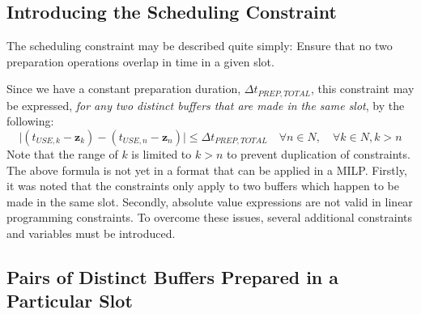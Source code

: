 \subsection{Introducing the Scheduling Constraint}\label{SS.schedintro}

The scheduling constraint may be described quite simply:
Ensure that no two preparation operations overlap in time in a given slot.

Since we have a constant preparation duration, 
$\Delta t_{\mathit{PREP,TOTAL}}$, this constraint may be expressed, 
\emph{for any two distinct buffers that are made in the same slot}, by the
following:
\begin{equation}
    \lvert \left( t_{\mathit{USE},k} - \boldsymbol{z}_{k} \right) - 
    \left( t_{\mathit{USE},n} - \boldsymbol{z}_{n} \right) \rvert \le \Delta
    t_{\mathit{PREP,TOTAL}} \quad \forall n
    \in N, \quad \forall k \in N, k > n
\end{equation}
Note that the range of $ k $ is limited to $ k > n $ to prevent duplication
of constraints.
The above formula is not yet in a format that can be applied in a MILP.
Firstly, it was noted that the constraints only apply to two buffers which
happen to be made in the same slot.
Secondly, absolute value expressions are not valid in linear programming
constraints.
To overcome these issues, several additional constraints and variables must be
introduced.

\subsection{Pairs of Distinct Buffers Prepared in a Particular Slot}\label{SS.constr6}

